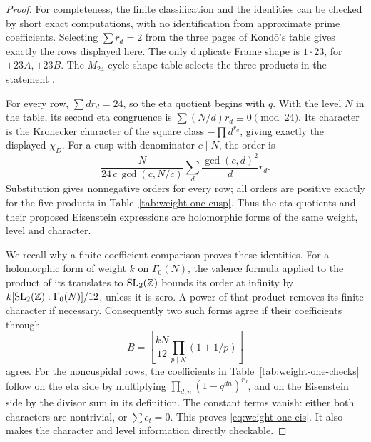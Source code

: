 \begin{proof}
For completeness, the finite classification and the identities can
be checked by short exact computations, with no identification from
approximate prime coefficients.
Selecting \(\sum r_d=2\) from the three pages of Kond\=o's
table gives exactly the rows displayed here. The only duplicate
Frame shape is \(1\cdot23\), for \(+23A,+23B\).
The \(M_{24}\) cycle-shape table selects the three products in
the statement \cite[Table~I, p.~154]{Koike1985}.

For every row, \(\sum d r_d=24\), so the eta quotient begins
with \(q\). With the level \(N\) in the table, its second eta
congruence is
\(\sum (N/d)r_d\equiv0\pmod{24}\).
Its character is the Kronecker character of the square class
\(-\prod d^{r_d}\), giving exactly the displayed \(\chi_D\).
For a cusp with denominator \(c\mid N\), the order is
\begin{equation}\label{eq:eta-cusp-order-weight1}
 \frac{N}{24\,c\,\gcd(c,N/c)}
       \sum_d\frac{\gcd(c,d)^2}{d}r_d.
\end{equation}
Substitution gives nonnegative orders for every row; all orders
are positive exactly for the five products in
Table~\ref{tab:weight-one-cusp}.
Thus the eta quotients and their proposed Eisenstein expressions
are holomorphic forms of the same weight, level and character.

We recall why a finite coefficient comparison proves these identities.
For a holomorphic form of weight \(k\) on \(\Gamma_0(N)\), the
valence formula applied to the product of its translates to
\(\mathrm{SL}_2(\mathbb Z)\) bounds its order at infinity by
\(k[\mathrm{SL}_2(\mathbb Z):\Gamma_0(N)]/12\), unless it is zero.
A power of that product removes its finite character if necessary.
Consequently two such forms agree if their coefficients through
\[
 B=\left\lfloor\frac{kN}{12}\prod_{p\mid N}(1+1/p)\right\rfloor
\]
agree. For the noncuspidal rows, the coefficients in
Table~\ref{tab:weight-one-checks} follow on the eta side by
multiplying \(\prod_{d,n}(1-q^{dn})^{r_d}\), and on the
Eisenstein side by the divisor sum in its definition.
The constant terms vanish: either both characters are nontrivial,
or \(\sum c_t=0\). This proves \eqref{eq:weight-one-eis}.
It also makes the character and level information directly
checkable.


\end{proof}
